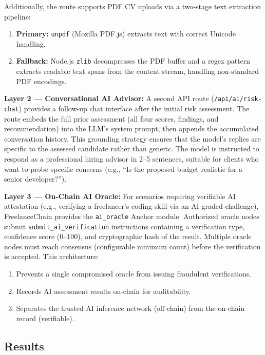 Additionally, the route supports PDF CV uploads via a two-stage text extraction pipeline:
\begin{enumerate}
    \item \textbf{Primary:} \texttt{unpdf} (Mozilla PDF.js) extracts text with correct Unicode handling.
    \item \textbf{Fallback:} Node.js \texttt{zlib} decompresses the PDF buffer and a regex pattern extracts readable text spans from the content stream, handling non-standard PDF encodings.
\end{enumerate}

\textbf{Layer 2 --- Conversational AI Advisor:} A second API route (\texttt{/api/ai/risk-chat}) provides a follow-up chat interface after the initial risk assessment. The route embeds the full prior assessment (all four scores, findings, and recommendation) into the LLM's system prompt, then appends the accumulated conversation history. This grounding strategy ensures that the model's replies are specific to the assessed candidate rather than generic. The model is instructed to respond as a professional hiring advisor in 2--5 sentences, suitable for clients who want to probe specific concerns (e.g., ``Is the proposed budget realistic for a senior developer?'').

\textbf{Layer 3 --- On-Chain AI Oracle:} For scenarios requiring verifiable AI attestation (e.g., verifying a freelancer's coding skill via an AI-graded challenge), FreelanceChain provides the \texttt{ai\_oracle} Anchor module. Authorized oracle nodes submit \texttt{submit\_ai\_verification} instructions containing a verification type, confidence score (0--100), and cryptographic hash of the result. Multiple oracle nodes must reach consensus (configurable minimum count) before the verification is accepted. This architecture:

\begin{enumerate}
    \item Prevents a single compromised oracle from issuing fraudulent verifications.
    \item Records AI assessment results on-chain for auditability.
    \item Separates the trusted AI inference network (off-chain) from the on-chain record (verifiable).
\end{enumerate}

\subsection{Results}

